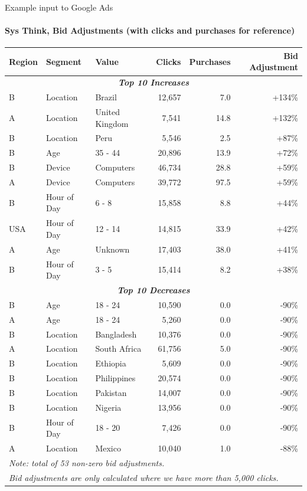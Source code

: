 \documentclass[smaller]{beamer}
\begin{document}
\begin{frame}{Example input to Google Ads}
\framesubtitle{Sys Think, Bid Adjustments (with clicks and purchases for reference)}
\begin{table}[h!]
\centering
\tiny %
\begin{tabular}{lllrrr}
\toprule
\textbf{Region} & \textbf{Segment} & \textbf{Value} & \textbf{Clicks} & \textbf{Purchases} & \textbf{Bid Adjustment} \\
\midrule
\multicolumn{6}{c}{\textit{\textbf{Top 10 Increases}}} \\
\midrule
B & Location & Brazil & 12,657 & 7.0 & +134\% \\
A & Location & United Kingdom & 7,541 & 14.8 & +132\% \\
B & Location & Peru & 5,546 & 2.5 & +87\% \\
B & Age & 35 - 44 & 20,896 & 13.9 & +72\% \\
B & Device & Computers & 46,734 & 28.8 & +59\% \\
A & Device & Computers & 39,772 & 97.5 & +59\% \\
B & Hour of Day & 6 - 8 & 15,858 & 8.8 & +44\% \\
USA & Hour of Day & 12 - 14 & 14,815 & 33.9 & +42\% \\
A & Age & Unknown & 17,403 & 38.0 & +41\% \\
B & Hour of Day & 3 - 5 & 15,414 & 8.2 & +38\% \\
\midrule
\multicolumn{6}{c}{\textit{\textbf{Top 10 Decreases}}} \\
\midrule
B & Age & 18 - 24 & 10,590 & 0.0 & -90\% \\
A & Age & 18 - 24 & 5,260 & 0.0 & -90\% \\
B & Location & Bangladesh & 10,376 & 0.0 & -90\% \\
A & Location & South Africa & 61,756 & 5.0 & -90\% \\
B & Location & Ethiopia & 5,609 & 0.0 & -90\% \\
B & Location & Philippines & 20,574 & 0.0 & -90\% \\
B & Location & Pakistan & 14,007 & 0.0 & -90\% \\
B & Location & Nigeria & 13,956 & 0.0 & -90\% \\
B & Hour of Day & 18 - 20 & 7,426 & 0.0 & -90\% \\
A & Location & Mexico & 10,040 & 1.0 & -88\% \\
\bottomrule
\multicolumn{6}{l}{\textit{Note: total of 53 non-zero bid adjustments.}} \\
\multicolumn{6}{l}{\textit{Bid adjustments are only calculated where we have more than 5,000 clicks.}} \\
\end{tabular}
\end{table}
\end{frame}
\end{document}
